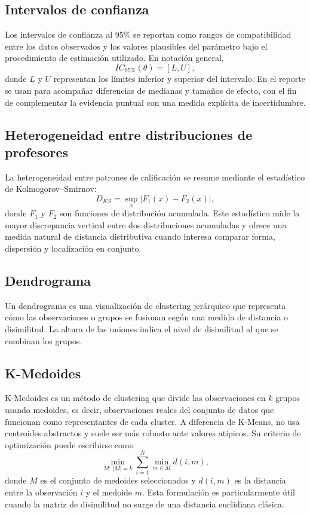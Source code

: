 \documentclass[10pt,letterpaper]{article} %
\numberwithin{figure}{subsection}
\begin{document}
\subsection{Intervalos de confianza}
\label{apx:ci}
Los intervalos de confianza al 95\% se reportan como rangos de compatibilidad entre los datos observados y los valores plausibles del parámetro bajo el procedimiento de estimación utilizado. En notación general,
\[
IC_{95\%}(\theta)=[L,U],
\]
donde $L$ y $U$ representan los límites inferior y superior del intervalo. En el reporte se usan para acompañar diferencias de medianas y tamaños de efecto, con el fin de complementar la evidencia puntual con una medida explícita de incertidumbre.

\subsection{Heterogeneidad entre distribuciones de profesores}
\label{apx:ks}
La heterogeneidad entre patrones de calificación se resume mediante el estadístico de Kolmogorov--Smirnov:
\[
D_{KS}=\sup_x |F_1(x)-F_2(x)|,
\]
donde $F_1$ y $F_2$ son funciones de distribución acumulada. Este estadístico mide la mayor discrepancia vertical entre dos distribuciones acumuladas y ofrece una medida natural de distancia distributiva cuando interesa comparar forma, dispersión y localización en conjunto.

\subsection{Dendrograma}
\label{apx:dendrograma}
Un dendrograma es una visualización de clustering jerárquico que representa cómo las observaciones o grupos se fusionan según una medida de distancia o disimilitud. La altura de las uniones indica el nivel de disimilitud al que se combinan los grupos.

\subsection{K-Medoides}
\label{apx:kmedoids}
K-Medoides es un método de clustering que divide las observaciones en $k$ grupos usando medoides, es decir, observaciones reales del conjunto de datos que funcionan como representantes de cada cluster. A diferencia de K-Means, no usa centroides abstractos y suele ser más robusto ante valores atípicos. Su criterio de optimización puede escribirse como
\[
\min_{M:\,|M|=k}\sum_{i=1}^{N}\min_{m\in M} d(i,m),
\]
donde $M$ es el conjunto de medoides seleccionados y $d(i,m)$ es la distancia entre la observación $i$ y el medoide $m$. Esta formulación es particularmente útil cuando la matriz de disimilitud no surge de una distancia euclidiana clásica.
\end{document}
